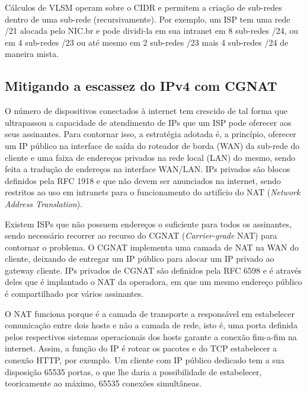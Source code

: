     Cálculos de VLSM operam sobre o CIDR e permitem a criação de sub-redes dentro de uma sub-rede (recursivamente). Por exemplo, um ISP tem uma rede /21 alocada pelo NIC.br e pode dividi-la em sua intranet em 8 sub-redes /24, ou em 4 sub-redes /23 ou até mesmo em 2 sub-redes /23 mais 4 sub-redes /24 de maneira mista.

\subsection{Mitigando a escassez do IPv4 com CGNAT}

    O número de dispositivos conectados à internet tem crescido de tal forma que ultrapassou a capacidade de atendimento de IPs que um ISP pode oferecer aos seus assinantes. Para contornar isso, a estratégia adotada é, a princípio, oferecer um IP público na interface de saída do roteador de borda (WAN) da sub-rede do cliente e uma faixa de endereços privados na rede local (LAN) do mesmo, sendo feita a tradução de endereços na interface WAN/LAN. IPs privados são blocos definidos pela RFC 1918 e que não devem ser anunciados na internet, sendo restritos ao uso em intranets para o funcionamento do artifício do NAT (\textit{Network Address Translation}).
    
    Existem ISPs que não possuem endereços o suficiente para todos os assinantes, sendo necessário recorrer ao recurso do CGNAT (\textit{Carrier-grade} NAT) para contornar o problema. O CGNAT implementa uma camada de NAT na WAN do cliente, deixando de entregar um IP público para alocar um IP privado ao gateway cliente. IPs privados de CGNAT são definidos pela RFC 6598 e é através deles que é implantado o NAT da operadora, em que um mesmo endereço público é compartilhado por vários assinantes.

   
   O NAT funciona porque é a camada de transporte a responsável em estabelecer comunicação entre dois hosts e não a camada de rede, isto é, uma porta definida pelos respectivos sistemas operacionais dos hosts garante a conexão fim-a-fim na internet. Assim, a função do IP é rotear os pacotes e do TCP estabelecer a conexão HTTP, por exemplo. Um cliente com IP público dedicado tem a sua disposição 65535 portas, o que lhe daria a possibilidade de estabelecer, teoricamente ao máximo, 65535 conexões simultâneas.
   
